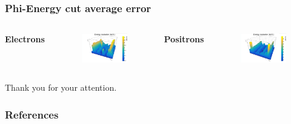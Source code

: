 \documentclass{beamer}
\begin{document}
		\begin{frame}
			\frametitle{Phi-Energy cut average error}
			\begin{columns}
				\centering
				\Large \textbf{Electrons}
				\begin{figure}
					\centering
					\includegraphics[width = 0.95 \linewidth]{images/c_e_phi_energy_abs.png}
				\end{figure}
				\centering
				\Large \textbf{Positrons}
				\begin{figure}
					\centering
					\includegraphics[width = 0.95 \linewidth]{images/c_p_phi_energy_abs.png}
				\end{figure}
			\end{columns}
		\end{frame}
	
	{
		\begin{frame}[noframenumbering]{}
			\begin{center}
				\Huge Thank you for your attention.
			\end{center}
		\end{frame}
	}
	
	\begin{frame}
		\frametitle{References}
		
		
	\end{frame}
	
\end{document}

